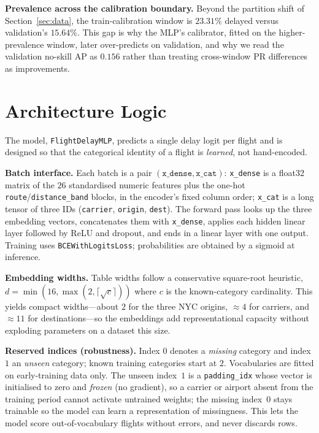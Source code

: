 \documentclass[conference]{IEEEtran}
\newcommand{\code}[1]{\texttt{#1}}
\begin{document}
\textbf{Prevalence across the calibration boundary.}
Beyond the partition shift of Section~\ref{sec:data}, the train-calibration
window is $23.31\%$ delayed versus validation's $15.64\%$. This gap is why the
MLP's calibrator, fitted on the higher-prevalence window, later over-predicts on
validation, and why we read the validation no-skill AP as $0.156$ rather than
treating cross-window PR differences as improvements.

\section{Architecture Logic}
\label{sec:arch}
The model, \code{FlightDelayMLP}, predicts a single delay logit per flight and is
designed so that the categorical identity of a flight is \emph{learned}, not
hand-encoded.

\textbf{Batch interface.}
Each batch is a pair $(\code{x\_dense}, \code{x\_cat})$: \code{x\_dense} is a
float32 matrix of the $26$ standardised numeric features plus the one-hot
\code{route}/\code{distance\_band} blocks, in the encoder's fixed column order;
\code{x\_cat} is a long tensor of three IDs (\code{carrier}, \code{origin},
\code{dest}). The forward pass looks up the three embedding vectors, concatenates
them with \code{x\_dense}, applies each hidden linear layer followed by ReLU and
dropout, and ends in a linear layer with one output. Training uses
\code{BCEWithLogitsLoss}; probabilities are obtained by a sigmoid at inference.

\textbf{Embedding widths.}
Table widths follow a conservative square-root heuristic,
$d=\min(16,\max(2,\lceil\sqrt{c}\rceil))$ where $c$ is the known-category
cardinality. This yields compact widths---about $2$ for the three NYC origins,
$\approx 4$ for carriers, and $\approx 11$ for destinations---so the embeddings
add representational capacity without exploding parameters on a dataset this
size.

\textbf{Reserved indices (robustness).}
Index $0$ denotes a \emph{missing} category and index $1$ an \emph{unseen}
category; known training categories start at $2$. Vocabularies are fitted on
early-training data only. The unseen index~$1$ is a \code{padding\_idx} whose
vector is initialised to zero and \emph{frozen} (no gradient), so a carrier or
airport absent from the training period cannot activate untrained weights; the
missing index~$0$ stays trainable so the model can learn a representation of
missingness. This lets the model score out-of-vocabulary flights without errors,
and never discards rows.
\end{document}

